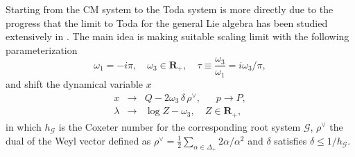 \documentclass[a4paper,12pt]{article}
\begin{document}
Starting from the CM system to the Toda system is more
directly due to the progress that the limit to Toda for the
general Lie algebra has been studied extensively in
\cite{ino1,hp5,kst}. The main idea is making suitable
scaling limit with the following parameterization
\begin{equation}
\omega _{1}=-i\pi ,\quad \omega _{3}\in \mathbf{R}_{+},\quad \tau \equiv {
\frac{\omega _{3}}{{\omega _{1}}}}=i\omega _{3}/\pi ,  \label{period}
\end{equation}
and shift the dynamical variable $x$
\begin{eqnarray}
x &\rightarrow &Q-2\omega _{3}\,\delta \,\rho ^{\vee
},~~~~~~~p\rightarrow P,
\nonumber \\
\lambda &\rightarrow &\log Z-\omega _{3},\quad Z\in \mathbf{R}_{+},
\label{shift}
\end{eqnarray}
in which $h_{\mathcal{G}}$ is the Coxeter number for the
corresponding root system $\mathcal{G}$, $\rho ^{\vee }$ the
dual of the Weyl vector defined as $\rho ^{\vee
}={\frac{1}{2}}\sum_{\alpha \in \Delta _{+}}2\alpha /\alpha
^{2} $ and $\delta $ satisfies $\delta \leq 1/h_{\mathcal{G}}$.
\end{document}

